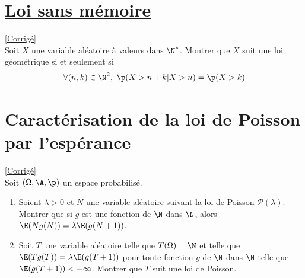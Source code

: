 \documentclass[8pt]{book}
\begin{document}
\section{\underline{Loi sans mémoire} }
\label{Loi sans mémoire}
\textcolor{blue}{\hyperref[Loi sans mémoire corrigé]{[Corrigé]}}\\
Soit $X$ une variable aléatoire à valeurs dans $\N^*$. Montrer que $X$ suit une loi géométrique si et seulement si $$\forall (n,k)\in\N^2, \ \p(X>n+k|X>n)=\p(X>k)$$

\section{Caractérisation de la loi de Poisson par l'espérance}
\label{Caractérisation de la loi de Poisson par l'espérance}
\textcolor{blue}{\hyperref[Caractérisation de la loi de Poisson par l'espérance corrigé]{[Corrigé]}}\\
Soit $(\Omega,\A,\p)$ un espace probabilisé.
\begin{enumerate}
	\item Soient $\lambda>0$ et $N$ une variable aléatoire suivant la loi de Poisson $\mathcal{P}(\lambda)$.
	\\Montrer que si $g$ est une fonction de $\N$ dans $\N$, alors $\E(Ng(N))=\lambda\E(g(N+1))$.
	\item Soit $T$ une variable aléatoire telle que $T(\Omega)=\N$ et telle que $\E(Tg(T))=\lambda\E(g(T+1))$ pour toute fonction $g$ de $\N$ dans $\N$ telle que $\E(g(T+1))<+\infty$. Montrer que $T$ suit une loi de Poisson.
\end{enumerate}
\end{document}
